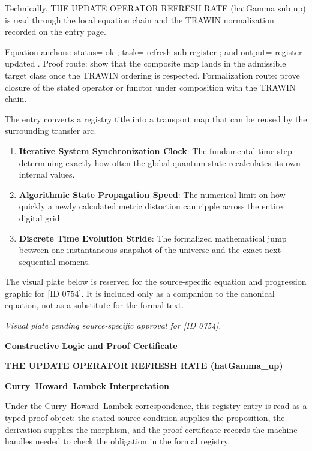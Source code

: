 Technically, THE UPDATE OPERATOR REFRESH RATE (hatGamma sub up) is read through the local equation chain and the TRAWIN normalization recorded on the entry page.

Equation anchors: status= ok ; task= refresh sub register ; and output= register updated . Proof route: show that the composite map lands in the admissible target class once the TRAWIN ordering is respected. Formalization route: prove closure of the stated operator or functor under composition with the TRAWIN chain.

The entry converts a registry title into a transport map that can be reused by the surrounding transfer arc.
\endgroup

\begin{enumerate}[leftmargin=1.6em,itemsep=6pt,topsep=4pt]
\item \textbf{Iterative System Synchronization Clock}: The fundamental time step determining exactly how often the global quantum state recalculates its own internal values.
\item \textbf{Algorithmic State Propagation Speed}: The numerical limit on how quickly a newly calculated metric distortion can ripple across the entire digital grid.
\item \textbf{Discrete Time Evolution Stride}: The formalized mathematical jump between one instantaneous snapshot of the universe and the exact next sequential moment.
\end{enumerate}

\begingroup\footnotesize\sloppy
The visual plate below is reserved for the source-specific equation and progression graphic for [ID 0754]. It is included only as a companion to the canonical equation, not as a substitute for the formal text.
\par\endgroup
\begingroup\footnotesize\itshape
Visual plate pending source-specific approval for [ID 0754].
\par\endgroup

\clearpage
\begingroup\tzpsupportsetup
\noindent\textbf{\fontsize{10.8pt}{12.8pt}\selectfont [ID 0754] Constructive Logic and Proof Certificate}\par
\noindent\textbf{\fontsize{10pt}{12pt}\selectfont THE UPDATE OPERATOR REFRESH RATE (hatGamma\_up)}\par
\vspace{0.45em}
\begingroup
\footnotesize
\setlength{\parskip}{0.22em}
\setlength{\parindent}{0pt}
\noindent\textbf{Curry--Howard--Lambek Interpretation}\par
Under the Curry--Howard--Lambek correspondence, this registry entry is read as a typed proof
object: the stated source condition supplies the proposition, the derivation supplies the
morphism, and the proof certificate records the machine handles needed to check the obligation
in the formal registry.

